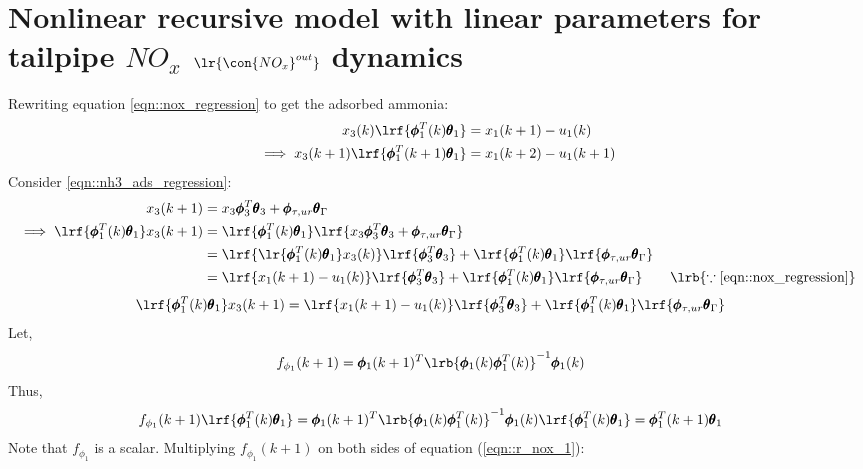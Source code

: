 \newpage
\section{Nonlinear recursive model with linear parameters for tailpipe $NO_x$ $\lr{\con{NO_x}^{out}}$ dynamics}
Rewriting equation \ref{eqn::nox_regression} to get the adsorbed ammonia:
\begin{align*}
        x_3(k) \lrf{\pmb \phi_1^T(k) \pmb \theta_1} &= {x_1(k+1) - u_1(k)}\\
        \implies x_3(k+1) \lrf{\pmb \phi_1^T(k+1) \pmb \theta_1} &= {x_1(k+2) - u_1(k+1)}
\end{align*}
Consider \ref{eqn::nh3_ads_regression}:
\begin{align*}
     x_3(k+1) &= x_3 \pmb \phi_3^T \pmb \theta_3 + \pmb \phi_{\tau, ur} \pmb \theta_\Gamma\\
     \implies \lrf{\pmb \phi_1^T(k) \pmb \theta_1} x_3(k+1) &= \lrf{\pmb \phi_1^T(k) \pmb \theta_1} \lrf{x_3 \pmb \phi_3^T \pmb \theta_3 + \pmb \phi_{\tau, ur} \pmb \theta_\Gamma}\\
     &= \lrf{\lr{\pmb \phi_1^T(k) \pmb \theta_1}x_3(k)} \lrf{\pmb \phi_3^T \pmb \theta_3}
     + \lrf{\pmb \phi_1^T(k) \pmb \theta_1} \lrf{\pmb \phi_{\tau, ur} \pmb \theta_\Gamma}\\
     &= \lrf{{x_1(k+1) - u_1(k)}} \lrf{\pmb \phi_3^T \pmb \theta_3}
     + \lrf{\pmb \phi_1^T(k) \pmb \theta_1} \lrf{\pmb \phi_{\tau, ur} \pmb \theta_\Gamma}  \qquad \lrb{\because \ref{eqn::nox_regression}}
\end{align*}
\begin{align}
        \lrf{\pmb \phi_1^T(k) \pmb \theta_1} x_3(k+1)
        &= \lrf{{x_1(k+1) - u_1(k)}} \lrf{\pmb \phi_3^T \pmb \theta_3} + \lrf{\pmb \phi_1^T(k) \pmb \theta_1} \lrf{\pmb \phi_{\tau, ur} \pmb \theta_\Gamma}
        \label{eqn::r_nox_1}
\end{align}
Let,
\begin{align}
        f_{\phi_1}(k+1) &= \pmb \phi_1(k+1)^T \lrb{\pmb \phi_1(k) \pmb \phi_1^T(k)}^{-1} \pmb \phi_1(k)
        \label{eqn::f_phi_1}
\end{align}
Thus,
\begin{align}
        f_{\phi_1}(k+1) \lrf{\pmb \phi_1^T(k) \pmb \theta_1} &= \pmb \phi_1(k+1)^T \lrb{\pmb \phi_1(k) \pmb \phi_1^T(k)}^{-1} \pmb \phi_1(k) \lrf{\pmb \phi_1^T(k) \pmb \theta_1}
        = \pmb \phi_1^T(k+1) \pmb \theta_1
        \label{eqn::f_phi_prop}
\end{align}
Note that $f_{\phi_1}$ is a scalar. Multiplying $f_{\phi_1}(k+1)$ on both sides of equation (\ref{eqn::r_nox_1}):

